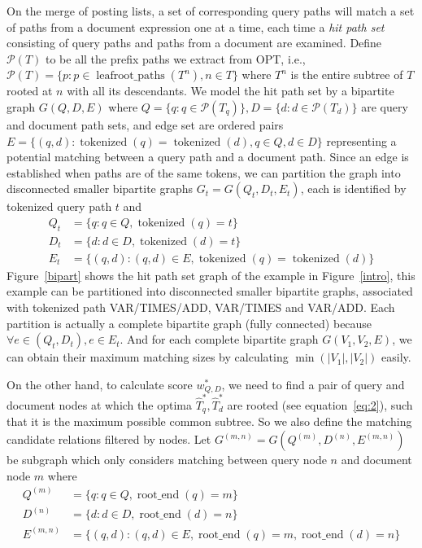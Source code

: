 \documentclass[runningheads]{llncs}
\begin{document}
On the merge of posting lists, a set of corresponding query paths will match a set of paths from a document expression one at a time, each time a \textit{hit path set} consisting of query paths and paths from a document are examined.
%
Define $\mathcal{P}(T)$ to be all the prefix paths we extract from OPT, i.e.,
$\mathcal{P}(T) = \{p: p \in \operatorname{leafroot\_paths}(T^n), n \in T\}$ where $T^n$ is the entire subtree of $T$ rooted at $n$ with all its descendants.
%
We model the hit path set by a bipartite graph 
$G(Q, D, E)$ where $Q = \{q: q \in \mathcal{P}(T_q)\}, D = \{d: d \in \mathcal{P}(T_d)\}$ are query and document path sets, and edge set are ordered pairs $E = \{(q, d): \operatorname{tokenized}(q) =  \operatorname{tokenized}(d), q \in Q, d \in D\}$ representing a potential matching between a query path and a document path.
Since an edge is established when paths are of the same tokens, we can partition the graph into disconnected smaller bipartite graphs $G_t = G(Q_t, D_t, E_t)$, each is identified by tokenized query path $t$ and
$$
\begin{aligned}
Q_t &= \{ q: q \in Q, \operatorname{tokenized}(q) = t\} \\
D_t &= \{d: d \in D, \operatorname{tokenized}(d) = t \} \\
E_t &= \{(q, d): (q, d) \in E, \operatorname{tokenized}(q) = \operatorname{tokenized}(d) \}
\end{aligned}
$$
Figure~\ref{bipart} shows the hit path set graph of the example in Figure~\ref{intro}, this example can be partitioned into disconnected smaller bipartite graphs, associated with tokenized path VAR/TIMES/ADD, VAR/TIMES and VAR/ADD.
Each partition is actually a complete bipartite graph (fully connected) because $\forall e \in (Q_t, D_t), e \in E_t$.
And for each complete bipartite graph $G(V_1, V_2, E)$, we can obtain their maximum matching sizes by calculating $\min(|V_1|, |V_2|)$ easily.

On the other hand, to calculate score $w^*_{Q, D}$, we need to find a pair of query and document nodes at which the optima $\hat{T}^*_q, \hat{T}^*_d$ are rooted (see equation~\ref{eq:2}), such that it is the maximum possible common subtree.
So we also define the matching candidate relations filtered by nodes.
Let $G^{(m, n)} = G(Q^{(m)}, D^{(n)}, E^{(m, n)})$ be subgraph which only considers matching between query node $n$ and document node $m$  where
$$
\begin{aligned}
Q^{(m)} &= \{ q: q \in Q, \operatorname{root\_end}(q) = m\} \\
D^{(n)} &= \{d: d \in D, \operatorname{root\_end}(d) = n\} \\
E^{(m, n)} &= \{(q, d): (q, d) \in E, \operatorname{root\_end}(q) = m, \operatorname{root\_end}(d) = n\} 
\end{aligned}
$$
\end{document}
